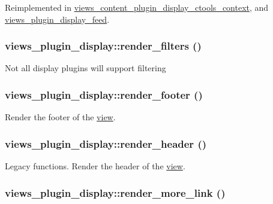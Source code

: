 Reimplemented in \hyperlink{classviews__content__plugin__display__ctools__context_a98c81b35153f725da4632087e870b709}{views\_\-content\_\-plugin\_\-display\_\-ctools\_\-context}, and \hyperlink{classviews__plugin__display__feed_a661fe08fd1be956d5b5cc40f36daf26b}{views\_\-plugin\_\-display\_\-feed}.\hypertarget{classviews__plugin__display_a9bdc16c7066a51729cedb9235bc15e6f}{
\subsubsection[{render\_\-filters}]{\setlength{\rightskip}{0pt plus 5cm}views\_\-plugin\_\-display::render\_\-filters ()}}
\label{classviews__plugin__display_a9bdc16c7066a51729cedb9235bc15e6f}
Not all display plugins will support filtering \hypertarget{classviews__plugin__display_a4b2a49cfccca396da8206e95fddadc0a}{
\subsubsection[{render\_\-footer}]{\setlength{\rightskip}{0pt plus 5cm}views\_\-plugin\_\-display::render\_\-footer ()}}
\label{classviews__plugin__display_a4b2a49cfccca396da8206e95fddadc0a}
Render the footer of the \hyperlink{classview}{view}. \hypertarget{classviews__plugin__display_a3c0302020ed6b1e8d6a0be40760533d6}{
\subsubsection[{render\_\-header}]{\setlength{\rightskip}{0pt plus 5cm}views\_\-plugin\_\-display::render\_\-header ()}}
\label{classviews__plugin__display_a3c0302020ed6b1e8d6a0be40760533d6}
Legacy functions. Render the header of the \hyperlink{classview}{view}. \hypertarget{classviews__plugin__display_ad680ce0ae6e6ed738ab9018f34e05703}{
\subsubsection[{render\_\-more\_\-link}]{\setlength{\rightskip}{0pt plus 5cm}views\_\-plugin\_\-display::render\_\-more\_\-link ()}}
